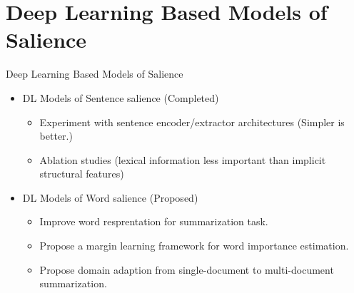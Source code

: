 \section{Deep Learning Based Models of Salience}

\begin{frame}{Deep Learning Based Models of Salience}

\begin{itemize}
    \item DL Models of Sentence salience \alert{(Completed)}
        \begin{itemize}
            \item Experiment with sentence encoder/extractor architectures \alert{(Simpler is better.)}
            \item Ablation studies 
    \alert{(lexical information less important than 
            implicit structural features)}
        \end{itemize}
    \item DL Models of Word salience \alert{(Proposed)}
        \begin{itemize}
            \item Improve word resprentation for summarization task.
            \item Propose a margin learning framework for word importance estimation.
            \item Propose domain adaption from single-document to multi-document summarization.
        \end{itemize}
\end{itemize}
\end{frame}
